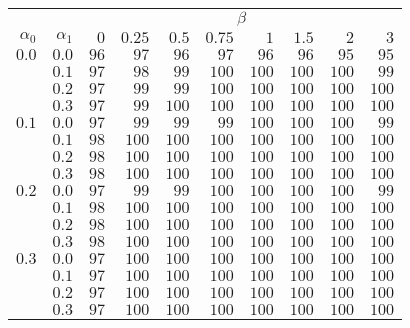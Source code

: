 \begin{tabular}{rr|rrrrrrrr}
\hline\hline
 && \multicolumn{8}{c}{$\beta$}\\
 $\alpha_0$ & $\alpha_1$ & $0$ & $0.25$ & $0.5$ & $0.75$ & $1$ & $1.5$ & $2$ & $3$ \\ 
 \hline
$0.0$ & $0.0$ & $96$ & $97$ & $96$ & $97$ & $96$ & $96$ & $95$ & $95$\\ 
 & $0.1$ & $97$ & $98$ & $99$ & $100$ & $100$ & $100$ & $100$ & $99$\\ 
 & $0.2$ & $97$ & $99$ & $99$ & $100$ & $100$ & $100$ & $100$ & $100$\\ 
 & $0.3$ & $97$ & $99$ & $100$ & $100$ & $100$ & $100$ & $100$ & $100$\\ 
\hline 
 $0.1$ & $0.0$ & $97$ & $99$ & $99$ & $99$ & $100$ & $100$ & $100$ & $99$\\ 
 & $0.1$ & $98$ & $100$ & $100$ & $100$ & $100$ & $100$ & $100$ & $100$\\ 
 & $0.2$ & $98$ & $100$ & $100$ & $100$ & $100$ & $100$ & $100$ & $100$\\ 
 & $0.3$ & $98$ & $100$ & $100$ & $100$ & $100$ & $100$ & $100$ & $100$\\ 
\hline 
 $0.2$ & $0.0$ & $97$ & $99$ & $99$ & $100$ & $100$ & $100$ & $100$ & $99$\\ 
 & $0.1$ & $98$ & $100$ & $100$ & $100$ & $100$ & $100$ & $100$ & $100$\\ 
 & $0.2$ & $98$ & $100$ & $100$ & $100$ & $100$ & $100$ & $100$ & $100$\\ 
 & $0.3$ & $98$ & $100$ & $100$ & $100$ & $100$ & $100$ & $100$ & $100$\\ 
\hline 
 $0.3$ & $0.0$ & $97$ & $100$ & $100$ & $100$ & $100$ & $100$ & $100$ & $100$\\ 
 & $0.1$ & $97$ & $100$ & $100$ & $100$ & $100$ & $100$ & $100$ & $100$\\ 
 & $0.2$ & $97$ & $100$ & $100$ & $100$ & $100$ & $100$ & $100$ & $100$\\ 
 & $0.3$ & $97$ & $100$ & $100$ & $100$ & $100$ & $100$ & $100$ & $100$\\ 
 \hline 
 \end{tabular}
